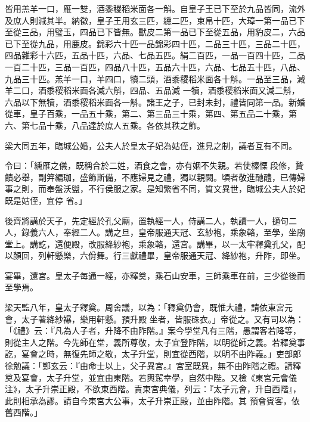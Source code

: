 \begin{pinyinscope}
 皆用羔羊一口，雁一雙，酒黍稷稻米面各一斛。自皇子王已下至於九品皆同，流外及庶人則減其半。納徵，皇子王用玄三匹，纁二匹，束帛十匹，大璋一第一品已下至從三品，用璧玉，四品已下皆無。獸皮二第一品已下至從五品，用豹皮二，六品已下至從九品，用鹿皮。錦彩六十匹一品錦彩四十匹，二品三十匹，三品二十匹，四品雜彩十六匹，五品十匹，六品、七品五匹。絹二百匹，一品一百四十匹，二品一百二十匹，三品一百匹，四品八十匹，五品六十匹，六品、七品五十匹，八品、九品三十匹。羔羊一口，羊四口，犢二頭，酒黍稷稻米面各十斛。一品至三品，減羊二口，酒黍稷稻米面各減六斛，四品、五品減
 一犢，酒黍稷稻米面又減二斛，六品以下無犢，酒黍稷稻米面各一斛。諸王之子，已封未封，禮皆同第一品。新婚從車，皇子百乘，一品五十乘，第二、第三品三十乘，第四、第五品二十乘，第六、第七品十乘，八品達於庶人五乘。各依其秩之飾。



 梁大同五年，臨城公婚，公夫人於皇太子妃為姑侄，進見之制，議者互有不同。



 令曰：「纁雁之儀，既稱合於二姓，酒食之會，亦有姻不失親。若使榛慄段修，贄饋必舉，副笄編珈，盛飾斯備，不應婦見之禮，獨以親闕。頃者敬進酏醴，已傳婦事之則，而奉盤沃盥，不行侯服之家。是知繁省不同，質文異世，臨城公夫人於妃既是姑侄，宜停
 省。」



 後齊將講於天子，先定經於孔父廟，置執經一人，侍講二人，執讀一人，擿句二人，錄義六人，奉經二人。講之旦，皇帝服通天冠、玄紗袍，乘象輅，至學，坐廟堂上。講訖，還便殿，改服絳紗袍，乘象輅，還宮。講畢，以一太牢釋奠孔父，配以顏回，列軒懸樂，六佾舞。行三獻禮畢，皇帝服通天冠、絳紗袍，升阼，即坐。



 宴畢，還宮。皇太子每通一經，亦釋奠，乘石山安車，三師乘車在前，三少從後而至學焉。



 梁天監八年，皇太子釋奠。周舍議，以為：「釋奠仍會，既惟大禮，請依東宮元會，太子著絳紗襮，樂用軒懸。預升殿
 坐者，皆服硃衣。」帝從之。又有司以為：「《禮》云：『凡為人子者，升降不由阼階。』案今學堂凡有三階，愚謂客若降等，則從主人之階。今先師在堂，義所尊敬，太子宜登阼階，以明從師之義。若釋奠事訖，宴會之時，無復先師之敬，太子升堂，則宜從西階，以明不由阼義。」吏部郎徐勉議：「鄭玄云：『由命士以上，父子異宮。』宮室既異，無不由阼階之禮。請釋奠及宴會，太子升堂，並宜由東階。若輿駕幸學，自然中陛。又檢《東宮元會儀注》，太子升崇正殿，不欲東西階。責東宮典儀，列云：『太子元會，升自西階』，此則相承為謬。請自今東宮大公事，太子升崇正殿，並由阼階。其
 預會賓客，依舊西階。」




\end{pinyinscope}
